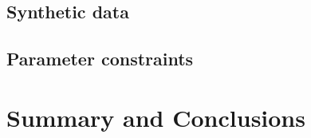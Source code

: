 \documentclass{wihuri}
\begin{document}
\subsection{Synthetic data}

\subsection{Parameter constraints}

\section{Summary and Conclusions}










\iffalse
\begin{figure}
\begin{center}
\setlength{\unitlength}{1cm}
\begin{picture}(6,6)(-3,-3)
\put(-1.5,0){\vector(1,0){3}}
\put(2.7,-0.1){$\chi$}
\put(0,-1.5){\vector(0,1){3}}
\multiput(-2.5,1)(0.4,0){13}
{\line(1,0){0.2}}
\multiput(-2.5,-1)(0.4,0){13}
{\line(1,0){0.2}}
\put(0.2,1.4)
{$\beta=v/c=\tanh\chi$}
\qbezier(0,0)(0.8853,0.8853)
(2,0.9640)
\qbezier(0,0)(-0.8853,-0.8853)
(-2,-0.9640)
\end{picture}
\caption{Tässä on hieno kuva}
\label{kuva1}
\end{center}
\end{figure}
\fi



%
%
%
%
%
%
\end{document}
